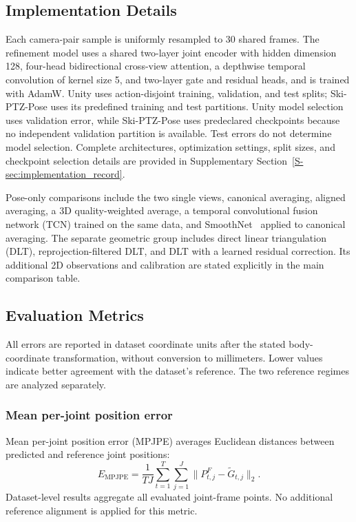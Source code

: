 \documentclass[preprint,12pt]{elsarticle}
\begin{document}


\subsection{Implementation Details}
\label{subsec:implementation_details}

Each camera-pair sample is uniformly resampled to 30 shared frames. The refinement model uses a shared two-layer joint encoder with hidden dimension 128, four-head bidirectional cross-view attention, a depthwise temporal convolution of kernel size 5, and two-layer gate and residual heads, and is trained with AdamW. Unity uses action-disjoint training, validation, and test splits; Ski-PTZ-Pose uses its predefined training and test partitions. Unity model selection uses validation error, while Ski-PTZ-Pose uses predeclared checkpoints because no independent validation partition is available. Test errors do not determine model selection. Complete architectures, optimization settings, split sizes, and checkpoint selection details are provided in Supplementary Section~\ref{S-sec:implementation_record}.

Pose-only comparisons include the two single views, canonical averaging, aligned averaging, a 3D quality-weighted average, a temporal convolutional fusion network (TCN) trained on the same data, and SmoothNet~\cite{zeng2022smoothnet} applied to canonical averaging. The separate geometric group includes direct linear triangulation (DLT), reprojection-filtered DLT, and DLT with a learned residual correction. Its additional 2D observations and calibration are stated explicitly in the main comparison table.

\subsection{Evaluation Metrics}

All errors are reported in dataset coordinate units after the stated body-coordinate transformation, without conversion to millimeters. Lower values indicate better agreement with the dataset's reference. The two reference regimes are analyzed separately.

\subsubsection{Mean per-joint position error}
Mean per-joint position error (MPJPE) averages Euclidean distances between predicted and reference joint positions:
\[
E_{\mathrm{MPJPE}}=\frac{1}{TJ}\sum_{t=1}^{T}\sum_{j=1}^{J}\|P^F_{t,j}-\tilde{G}_{t,j}\|_2.
\]
Dataset-level results aggregate all evaluated joint-frame points. No additional reference alignment is applied for this metric.
\end{document}
